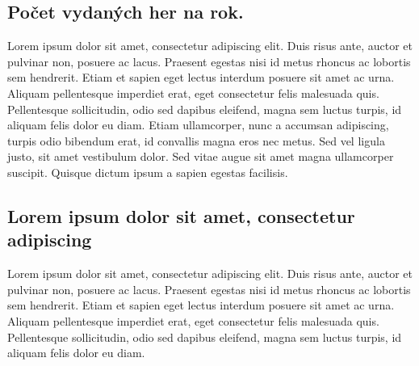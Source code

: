 \documentclass[a4paper,11pt]{article}
\begin{document}
\subsection{Počet vydaných her na rok.}
Lorem ipsum dolor sit amet, consectetur adipiscing elit. Duis risus ante, auctor et pulvinar non, posuere ac lacus. Praesent egestas nisi id metus rhoncus ac lobortis sem hendrerit. Etiam et sapien eget lectus interdum posuere sit amet ac urna. Aliquam pellentesque imperdiet erat, eget consectetur felis malesuada quis. Pellentesque sollicitudin, odio sed dapibus eleifend, magna sem luctus turpis, id aliquam felis dolor eu diam. Etiam ullamcorper, nunc a accumsan adipiscing, turpis odio bibendum erat, id convallis magna eros nec metus. Sed vel ligula justo, sit amet vestibulum dolor. Sed vitae augue sit amet magna ullamcorper suscipit. Quisque dictum ipsum a sapien egestas facilisis. 

\subsection{Lorem ipsum dolor sit amet, consectetur adipiscing}
Lorem ipsum dolor sit amet, consectetur adipiscing elit. Duis risus ante, auctor et pulvinar non, posuere ac lacus. Praesent egestas nisi id metus rhoncus ac lobortis sem hendrerit. Etiam et sapien eget lectus interdum posuere sit amet ac urna. Aliquam pellentesque imperdiet erat, eget consectetur felis malesuada quis. Pellentesque sollicitudin, odio sed dapibus eleifend, magna sem luctus turpis, id aliquam felis dolor eu diam.
\end{document}

